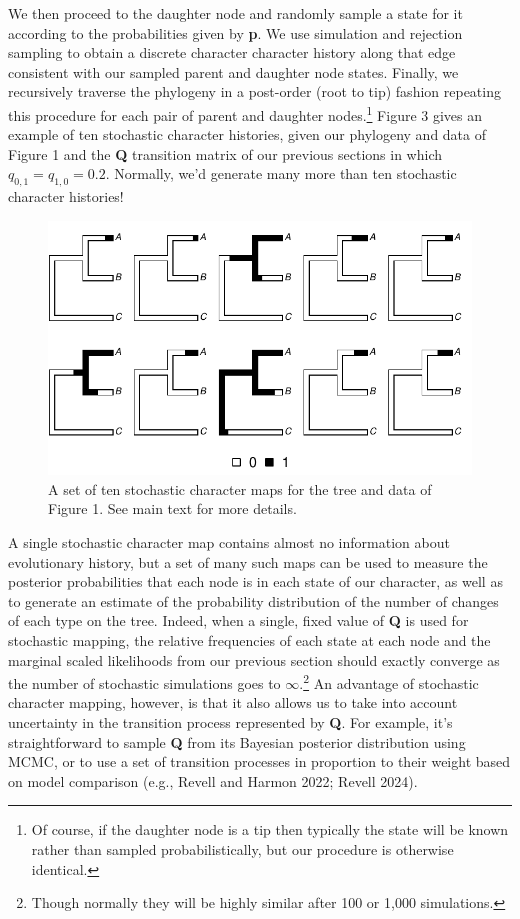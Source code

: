 \documentclass{article}
\begin{document}
We then proceed to the daughter node and randomly sample a state for it according to the probabilities given by \textbf{p}. We use simulation and rejection sampling to obtain a discrete character character history along that edge consistent with our sampled parent and daughter node states. Finally, we recursively traverse the phylogeny in a post-order (root to tip) fashion repeating this procedure for each pair of parent and daughter nodes.\footnote{Of course, if the daughter node is a tip then typically the state will be known rather than sampled probabilistically, but our procedure is otherwise identical.} Figure 3 gives an example of ten stochastic character histories, given our phylogeny and data of Figure 1 and the \textbf{Q} transition matrix of our previous sections in which \(q_{0,1} = q_{1,0} = 0.2\). Normally, we'd generate many more than ten stochastic character histories!

\begin{figure}
\centering
\includegraphics{Revell.AncestralReconstruction_files/figure-latex/fig3-1.pdf}
\caption{\label{fig:fig3}A set of ten stochastic character maps for the tree and data of Figure 1. See main text for more details.}
\end{figure}

A single stochastic character map contains almost no information about evolutionary history, but a set of many such maps can be used to measure the posterior probabilities that each node is in each state of our character, as well as to generate an estimate of the probability distribution of the number of changes of each type on the tree. Indeed, when a single, fixed value of \textbf{Q} is used for stochastic mapping, the relative frequencies of each state at each node and the marginal scaled likelihoods from our previous section should exactly converge as the number of stochastic simulations goes to \(\infty\).\footnote{Though normally they will be highly similar after 100 or 1,000 simulations.} An advantage of stochastic character mapping, however, is that it also allows us to take into account uncertainty in the transition process represented by \textbf{Q}. For example, it's straightforward to sample \textbf{Q} from its Bayesian posterior distribution using MCMC, or to use a set of transition processes in proportion to their weight based on model comparison (e.g., Revell and Harmon 2022; Revell 2024).
\end{document}
